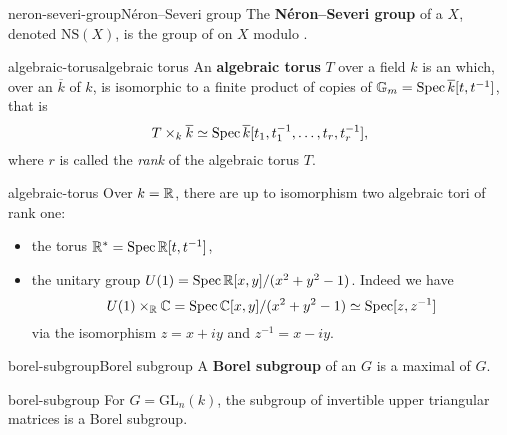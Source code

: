 \begin{topic}{neron-severi-group}{Néron--Severi group}
    The \textbf{Néron--Severi group} of a  $X$, denoted $\text{NS}(X)$, is the group of  on $X$ modulo .
\end{topic}

\begin{topic}{algebraic-torus}{algebraic torus}
    An \textbf{algebraic torus} $T$ over a field $k$ is an  which, over an  $\overline{k}$ of $k$, is isomorphic to a finite product of copies of $\mathbb{G}_m = \operatorname{Spec} \overline{k}[t, t^{-1}]$, that is
    \[ T \times_k \overline{k} \simeq \operatorname{Spec} \overline{k}[t_1, t_1^{-1}, \ldots, t_r, t_r^{-1}] , \]
    where $r$ is called the \textit{rank} of the algebraic torus $T$.
\end{topic}

\begin{example}{algebraic-torus}
    Over $k = \mathbb{R}$, there are up to isomorphism two algebraic tori of rank one:
    \begin{itemize}
        \item the torus $\mathbb{R}^* = \operatorname{Spec} \mathbb{R}[t, t^{-1}]$,
        \item the unitary group $U(1) = \operatorname{Spec} \mathbb{R}[x, y] / (x^2 + y^2 - 1)$. Indeed we have
        \[ U(1) \times_{\mathbb{R}} \mathbb{C} = \operatorname{Spec} \mathbb{C}[x, y] / (x^2 + y^2 - 1) \simeq \operatorname{Spec}[z, z^{-1}] \]
        via the isomorphism $z = x + iy$ and $z^{-1} = x - iy$.
    \end{itemize}
\end{example}

\begin{topic}{borel-subgroup}{Borel subgroup}
    A \textbf{Borel subgroup} of an  $G$ is a maximal    of $G$.
\end{topic}

\begin{example}{borel-subgroup}
    For $G = \text{GL}_n(k)$, the subgroup of invertible upper triangular matrices is a Borel subgroup.
\end{example}


